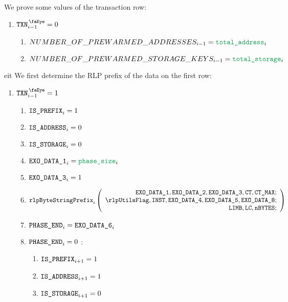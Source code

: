 We prove some values of the transaction row:
\begin{enumerate}[resume]
	\item \If $\isTxn_{i-1}=0$ \Then
		\begin{enumerate}
			\item $\nbWarmedAddress_{i-1} = \locTotNbOfAddress_{i}$
			\item $\nbWarmedStorageKey_{i-1} = \locTotNbOfStorage_{i}$
		\end{enumerate}
\end{enumerate}
eit
We first determine the RLP prefix of the data on the first row:
\begin{enumerate}[resume]
	\item \If $\isTxn_{i-1}=1$ \Then
		\begin{enumerate}
			\item $\texttt{IS\_PREFIX} _{i} = 1$
			\item $\texttt{IS\_ADDRESS}   _{i} = 0$
			\item $\texttt{IS\_STORAGE}    _{i} = 0$
			\item $\exoDataColumn{1}_{i} = \locPhaseSize_{i}$
			\item $\texttt{EXO\_DATA\_3}_{i} = 1$
			\item
				\[
					\rlpBytestringPrefix_{i}
					\left(
					\begin{array}{r}
						\exoDataColumn{1},
						\exoDataColumn{2},
						\exoDataColumn{3},
						\ct,
						\maxCt; \\
						\rlpUtilsFlag,
						\INST,
						\exoDataColumn{4},
						\exoDataColumn{5},
						\exoDataColumn{8}; \\
						\limb,
						\lc,
						\limbsize; \\
					\end{array}
					\right)
				\]
			\item $\texttt{PHASE\_END}_{i} = \texttt{EXO\_DATA\_6}_{i}$
			\item \If $\texttt{PHASE\_END}_{i} =0$ \Then:
				\begin{enumerate}
					\item $\texttt{IS\_PREFIX} _{i+1} = 1$
					\item $\texttt{IS\_ADDRESS}   _{i+1} = 1$
					\item $\texttt{IS\_STORAGE}    _{i+1} = 0$
				\end{enumerate}
		\end{enumerate}
\end{enumerate}

